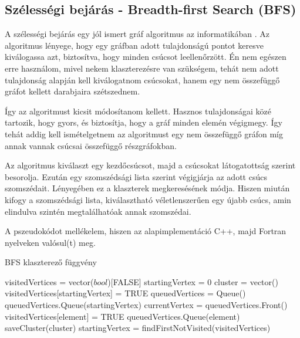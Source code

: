 \documentclass[a4paper,12pt]{article}
\begin{document}
\vspace{5mm}

\subsection{ Szélességi bejárás - Breadth-first Search (BFS)}

\par A szélességi bejárás egy jól ismert gráf algoritmus az informatikában \cite{bfs}. Az algoritmus lényege, hogy egy gráfban adott tulajdonságú pontot keresve kiválogassa azt, biztosítva, hogy minden csúcsot leellenőrzött. Én nem egészen erre használom, mivel nekem klaszterezésre van szükségem, tehát nem adott tulajdonság alapján kell kiválogatnom csúcsokat, hanem egy nem összefüggő gráfot kellett darabjaira szétszednem.

\vspace{5mm}

\par Így az algoritmust kicsit módosítanom kellett. Hasznos tulajdonságai közé tartozik, hogy gyors, és biztosítja, hogy a gráf minden elemén végigmegy. Így tehát addig kell ismételgetnem az algoritmust egy nem összefüggő gráfon míg annak vannak csúcsai összefüggő részgráfokban. 

\vspace{5mm}

\par Az algoritmus kiválaszt egy kezdőcsúcsot, majd a csúcsokat látogatottság szerint besorolja. Ezután egy szomszédsági lista szerint végigjárja az adott csúcs szomszédait. Lényegében ez a klaszterek megkeresésének módja. Hiszen miután kifogy a szomszédsági lista, kiválasztható véletlenszerűen egy újabb csúcs, amin elindulva szintén megtalálhatóak annak szomszédai. 

\vspace{5mm}

\par A pszeudokódot mellékelem, hiszen az alapimplementáció C++, majd Fortran nyelveken valósul(t) meg.

\vspace{5mm}

\begin{center}
\begin{algorithm}
\caption{BFS klaszterező függvény}
\begin{algorithmic}
\STATE visitedVertices = vector($bool$)[FALSE]
\STATE startingVertex = 0
	\STATE cluster = vector()
	\STATE visitedVertices[startingVertex] = TRUE
	\STATE queuedVertices = Queue()
	\STATE queuedVertices.Queue(startingVertex)
		\STATE currentVertex = queuedVertices.Front()
				\STATE visitedVertices[element] = TRUE
				\STATE queuedVertices.Queue(element)
			\ENDIF
		\ENDFOR
	\STATE saveCluster(cluster)
	\STATE startingVertex = findFirstNotVisited(visitedVertices)
	\ENDWHILE
\ENDWHILE
\end{algorithmic}
\end{algorithm}
\end{center}
\end{document}
